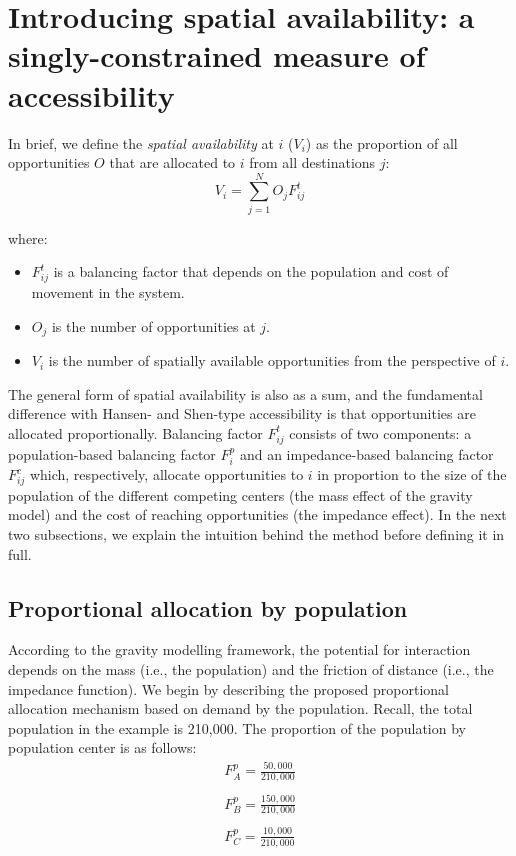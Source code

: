 \documentclass[10pt,letterpaper]{article}
\providecommand{\tightlist}{%
  \setlength{\itemsep}{0pt}\setlength{\parskip}{0pt}}
\begin{document}
\hypertarget{introducing-spatial-availability-a-singly-constrained-measure-of-accessibility}{%
\section{Introducing spatial availability: a singly-constrained measure
of
accessibility}\label{introducing-spatial-availability-a-singly-constrained-measure-of-accessibility}}

In brief, we define the \emph{spatial availability} at \(i\) (\(V_{i}\))
as the proportion of all opportunities \(O\) that are allocated to \(i\)
from all destinations \(j\): \[
V_i = \sum_{j=1}^NO_jF^t_{ij}
\]

\noindent where:

\begin{itemize}
\tightlist
\item
  \(F^t_{ij}\) is a balancing factor that depends on the population and
  cost of movement in the system.
\item
  \(O_j\) is the number of opportunities at \(j\).
\item
  \(V_i\) is the number of spatially available opportunities from the
  perspective of \(i\).
\end{itemize}

The general form of spatial availability is also as a sum, and the
fundamental difference with Hansen- and Shen-type accessibility is that
opportunities are allocated proportionally. Balancing factor
\(F^t_{ij}\) consists of two components: a population-based balancing
factor \(F^p_{i}\) and an impedance-based balancing factor \(F^c_{ij}\)
which, respectively, allocate opportunities to \(i\) in proportion to
the size of the population of the different competing centers (the mass
effect of the gravity model) and the cost of reaching opportunities (the
impedance effect). In the next two subsections, we explain the intuition
behind the method before defining it in full.

\hypertarget{proportional-allocation-by-population}{%
\subsection{Proportional allocation by
population}\label{proportional-allocation-by-population}}

According to the gravity modelling framework, the potential for
interaction depends on the mass (i.e., the population) and the friction
of distance (i.e., the impedance function). We begin by describing the
proposed proportional allocation mechanism based on demand by the
population. Recall, the total population in the example is 210,000. The
proportion of the population by population center is as follows: \[
\begin{array}{l}
F^p_A = \frac{50,000}{210,000}\\
\\
F^p_B = \frac{150,000}{210,000}\\
\\
F^p_C = \frac{10,000}{210,000}\\
\end{array}
\]
\end{document}
